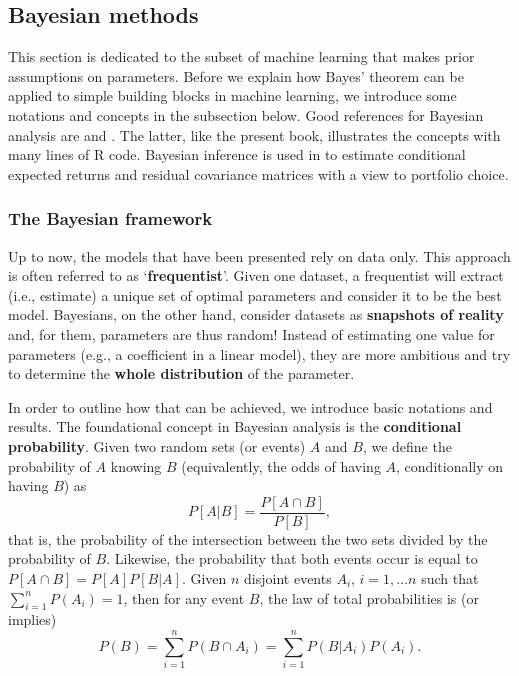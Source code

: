 \subsection{Bayesian methods}

This section is dedicated to the subset of machine learning that makes prior assumptions on parameters. Before we explain how Bayes' theorem can be applied to simple building blocks in machine learning, we introduce some notations and concepts in the subsection below. Good references for Bayesian analysis are \cite{gelman2013bayesian} and \cite{kruschke2014doing}. The latter, like the present book, illustrates the concepts with many lines of R code. Bayesian inference is used in \cite{feng2021factor} to estimate conditional expected returns and residual covariance matrices with a view to portfolio choice.

\subsubsection{The Bayesian framework}

Up to now, the models that have been presented rely on data only. This approach is often referred to as `\textbf{frequentist}'. Given one dataset, a frequentist will extract (i.e., estimate) a unique set of optimal parameters and consider it to be the best model. Bayesians, on the other hand, consider datasets as \textbf{snapshots of reality} and, for them, parameters are thus random! Instead of estimating one value for parameters (e.g., a coefficient in a linear model), they are more ambitious and try to determine the \textbf{whole distribution} of the parameter.

In order to outline how that can be achieved, we introduce basic notations and results. The foundational concept in Bayesian analysis is the \textbf{conditional probability}. Given two random sets (or events) $A$ and $B$, we define the probability of $A$ knowing $B$ (equivalently, the odds of having $A$, conditionally on having $B$) as
\begin{equation}
P[A|B]=\frac{P[A \cap B]}{P[B]},
\end{equation}
that is, the probability of the intersection between the two sets divided by the probability of $B$. Likewise, the probability that both events occur is equal to $P[A \cap B] = P[A]P[B|A]$. Given $n$ disjoint events $A_i$, $i=1,...n$ such that $\sum_{i=1}^nP(A_i)=1$, then for any event $B$, the law of total probabilities is (or implies)
\begin{equation}
P(B)=\sum_{i=1}^nP(B \cap A_i)= \sum_{i=1}^nP(B|A_i)P(A_i).
\end{equation}

